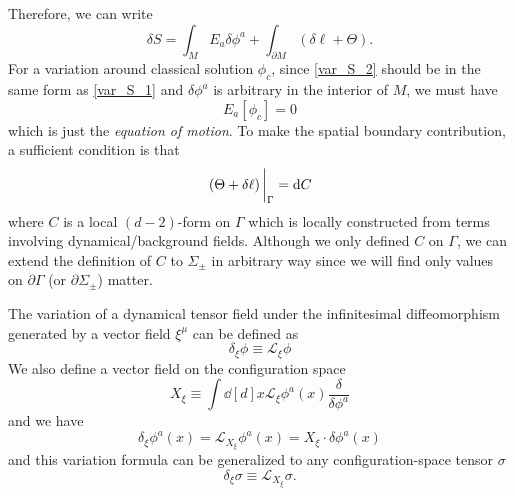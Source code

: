 \documentclass[10pt]{article}
\begin{document}
Therefore, we can write
\begin{equation}
    \delta S=\int_M E_a\delta\phi^a+\int_{\partial M}\left(\delta\ell+\Theta\right).\label{var_S_2}
\end{equation}
For a variation around classical solution $\phi_c$, since \cref{var_S_2} should be in the same form as \cref{var_S_1} and $\delta\phi^a$ is arbitrary in the interior of $M$, we must have
\begin{equation}
    E_a[\phi_c]=0
\end{equation}
which is just the \textit{equation of motion}.
To make the spatial boundary contribution, a sufficient condition is that
\begin{equation}\label{spatial_boundary_requirement}
    \eval{\left(\Theta+\delta\ell\right)}_\Gamma=\dd{C}
\end{equation}
where $C$ is a local $(d-2)$-form on $\Gamma$ which is locally constructed from terms involving dynamical/background fields.
Although we only defined $C$ on $\Gamma$, we can extend the definition of $C$ to $\Sigma_{\pm}$ in arbitrary way since we will find only values on $\partial\Gamma$ (or $\partial\Sigma_{\pm}$) matter.



The variation of a dynamical tensor field under the infinitesimal diffeomorphism generated by a vector field $\xi^\mu$ can be defined as
\begin{equation}
    \delta_{\xi}\phi\equiv\mathcal{L}_\xi \phi
\end{equation}
We also define a vector field on the configuration space
\begin{equation}
    X_\xi\equiv\int\dd[d]{x}\mathcal{L}_\xi \phi^a(x)\frac{\delta}{\delta \phi^a}
\end{equation}
and we have
\begin{equation}
    \delta_\xi \phi^a(x)=\mathcal{L}_{X_\xi}\phi^a(x)=X_{\xi}\cdot\delta\phi^a(x)
\end{equation}
and this variation formula can be generalized to any configuration-space tensor $\sigma$
\begin{equation}
    \delta_\xi\sigma\equiv\mathcal{L}_{X_\xi}\sigma.
\end{equation}
\end{document}

